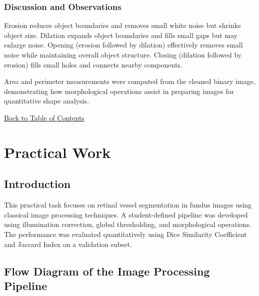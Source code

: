 \documentclass[12pt,a4paper]{article}
\begin{document}
\subsubsection*{Discussion and Observations}

Erosion reduces object boundaries and removes small white noise but shrinks object size. Dilation expands object boundaries and fills small gaps but may enlarge noise. Opening (erosion followed by dilation) effectively removes small noise while maintaining overall object structure. Closing (dilation followed by erosion) fills small holes and connects nearby components. 

Area and perimeter measurements were computed from the cleaned binary image, demonstrating how morphological operations assist in preparing images for quantitative shape analysis.


\hyperref[contents]{\small Back to Table of Contents}
\newpage


\section{Practical Work}

\subsection*{Introduction}

This practical task focuses on retinal vessel segmentation in fundus images using classical image processing techniques. A student-defined pipeline was developed using illumination correction, global thresholding, and morphological operations. The performance was evaluated quantitatively using Dice Similarity Coefficient and Jaccard Index on a validation subset.

\subsection*{Flow Diagram of the Image Processing Pipeline}
\end{document}
